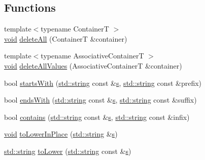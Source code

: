 \subsection*{Functions}
\begin{DoxyCompactItemize}
\item 
{\footnotesize template$<$typename ContainerT $>$ }\\\hyperlink{_s_d_l__opengles2__gl2ext_8h_ae5d8fa23ad07c48bb609509eae494c95}{void} \hyperlink{namespace_catch_aadf9786550a462740ec355f8219863a9}{delete\+All} (ContainerT \&container)
\item 
{\footnotesize template$<$typename Associative\+ContainerT $>$ }\\\hyperlink{_s_d_l__opengles2__gl2ext_8h_ae5d8fa23ad07c48bb609509eae494c95}{void} \hyperlink{namespace_catch_af2fcec1d4bd984fe19ff8b9a432c36a8}{delete\+All\+Values} (Associative\+ContainerT \&container)
\item 
bool \hyperlink{namespace_catch_a695f62327be0676e046291eeaae15110}{starts\+With} (\hyperlink{_s_d_l__opengl__glext_8h_ae84541b4f3d8e1ea24ec0f466a8c568b}{std\+::string} const \&\hyperlink{_s_d_l__opengl_8h_a4af680a6c683f88ed67b76f207f2e6e4}{s}, \hyperlink{_s_d_l__opengl__glext_8h_ae84541b4f3d8e1ea24ec0f466a8c568b}{std\+::string} const \&prefix)
\item 
bool \hyperlink{namespace_catch_ada025504f627feaf9ac68ca391515dff}{ends\+With} (\hyperlink{_s_d_l__opengl__glext_8h_ae84541b4f3d8e1ea24ec0f466a8c568b}{std\+::string} const \&\hyperlink{_s_d_l__opengl_8h_a4af680a6c683f88ed67b76f207f2e6e4}{s}, \hyperlink{_s_d_l__opengl__glext_8h_ae84541b4f3d8e1ea24ec0f466a8c568b}{std\+::string} const \&suffix)
\item 
bool \hyperlink{namespace_catch_aa52974b0e426e7e2fbd725a900e9c36e}{contains} (\hyperlink{_s_d_l__opengl__glext_8h_ae84541b4f3d8e1ea24ec0f466a8c568b}{std\+::string} const \&\hyperlink{_s_d_l__opengl_8h_a4af680a6c683f88ed67b76f207f2e6e4}{s}, \hyperlink{_s_d_l__opengl__glext_8h_ae84541b4f3d8e1ea24ec0f466a8c568b}{std\+::string} const \&infix)
\item 
\hyperlink{_s_d_l__opengles2__gl2ext_8h_ae5d8fa23ad07c48bb609509eae494c95}{void} \hyperlink{namespace_catch_a0760dbe87d090a55a35414db57d272c4}{to\+Lower\+In\+Place} (\hyperlink{_s_d_l__opengl__glext_8h_ae84541b4f3d8e1ea24ec0f466a8c568b}{std\+::string} \&\hyperlink{_s_d_l__opengl_8h_a4af680a6c683f88ed67b76f207f2e6e4}{s})
\item 
\hyperlink{_s_d_l__opengl__glext_8h_ae84541b4f3d8e1ea24ec0f466a8c568b}{std\+::string} \hyperlink{namespace_catch_ac036a17412d318598ffda8e1fe7a1177}{to\+Lower} (\hyperlink{_s_d_l__opengl__glext_8h_ae84541b4f3d8e1ea24ec0f466a8c568b}{std\+::string} const \&\hyperlink{_s_d_l__opengl_8h_a4af680a6c683f88ed67b76f207f2e6e4}{s})

\end{DoxyCompactItemize}
